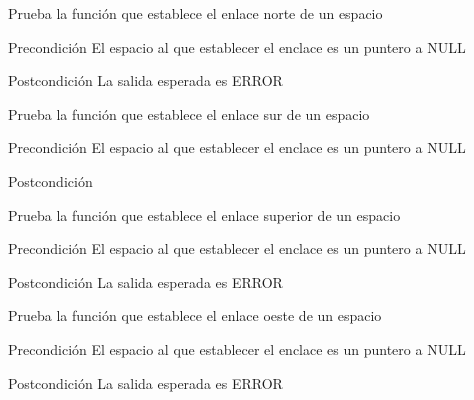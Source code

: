 \begin{DoxyRefList}
\item[\label{test__test000254}%
\hypertarget{test__test000254}{}%
Global \hyperlink{space__test_8c_a3bc7fe26c1e36ffd195099a9983206e1}{test2\-\_\-space\-\_\-set\-\_\-north} ()]Prueba la función que establece el enlace norte de un espacio \begin{DoxyPrecond}{Precondición}
El espacio al que establecer el enclace es un puntero a N\-U\-L\-L 
\end{DoxyPrecond}
\begin{DoxyPostcond}{Postcondición}
La salida esperada es E\-R\-R\-O\-R  
\end{DoxyPostcond}

\item[\label{test__test000257}%
\hypertarget{test__test000257}{}%
Global \hyperlink{space__test_8c_ac9f950741f12ccfcc5ad5d9e71d3d90a}{test2\-\_\-space\-\_\-set\-\_\-south} ()]Prueba la función que establece el enlace sur de un espacio \begin{DoxyPrecond}{Precondición}
El espacio al que establecer el enclace es un puntero a N\-U\-L\-L 
\end{DoxyPrecond}
\begin{DoxyPostcond}{Postcondición}

\end{DoxyPostcond}

\item[\label{test__test000266}%
\hypertarget{test__test000266}{}%
Global \hyperlink{space__test_8c_a93508104720cd2f5ba4ac9652d8d238e}{test2\-\_\-space\-\_\-set\-\_\-up} ()]Prueba la función que establece el enlace superior de un espacio \begin{DoxyPrecond}{Precondición}
El espacio al que establecer el enclace es un puntero a N\-U\-L\-L 
\end{DoxyPrecond}
\begin{DoxyPostcond}{Postcondición}
La salida esperada es E\-R\-R\-O\-R  
\end{DoxyPostcond}

\item[\label{test__test000263}%
\hypertarget{test__test000263}{}%
Global \hyperlink{space__test_8c_aa51b05ffd99b7bbd8f2dfc23c8f85870}{test2\-\_\-space\-\_\-set\-\_\-west} ()]Prueba la función que establece el enlace oeste de un espacio \begin{DoxyPrecond}{Precondición}
El espacio al que establecer el enclace es un puntero a N\-U\-L\-L 
\end{DoxyPrecond}
\begin{DoxyPostcond}{Postcondición}
La salida esperada es E\-R\-R\-O\-R  
\end{DoxyPostcond}


\end{DoxyRefList}
